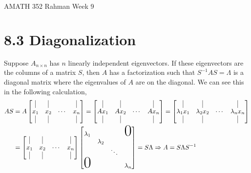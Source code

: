 \documentclass[reqno]{amsart}
\theoremstyle{definition}
\begin{document}
\begin{flushleft}
{\sc \Large AMATH 352 Rahman} \hfill Week 9
\bigskip
\end{flushleft}

\newcommand{\R}{\mathbb{R}}
\newcommand{\N}{\mathbb{N}}
\newcommand{\Z}{\mathbb{Z}}
\newcommand{\Q}{\mathbb{Q}}
\renewcommand{\CancelColor}{\color{red}}
\newcommand{\?}{\stackrel{?}{=}}
\renewcommand{\varphi}{\phi}
\newcommand{\card}{\text{Card}}
\newcommand{\bigzero}{\text{\Huge 0}}
\newcommand{\curvearrowdown}{{\color{red}\rotatebox{90}{$\curvearrowleft$}}}
\newcommand{\curvearrowup}{{\color{red}\rotatebox{90}{$\curvearrowright$}}}

\newcommand*\circled[1]{\color{red}\tikz[baseline=(char.base)]{
            \node[shape=circle,draw,inner sep=2pt] (char) {#1};}}



\section*{8.3 Diagonalization}

Suppose $A_{n\times n}$ has $n$ linearly independent eigenvectors.  If these eigenvectors are the columns of a matrix $S$, then $A$ has a factorization such that $S^{-1}AS = \Lambda$ is a diagonal matrix where the eigenvalues of $A$ are on the diagonal.  We can see this in the following calculation,
%
\begin{align*}
AS &= A\begin{bmatrix}
\vline & \vline & & \vline\\
x_1 & x_2 & \cdots & x_n\\
\vline & \vline & & \vline
\end{bmatrix} = \begin{bmatrix}
\vline & \vline & & \vline\\
Ax_1 & Ax_2 & \cdots & Ax_n\\
\vline & \vline & & \vline
\end{bmatrix} = \begin{bmatrix}
\vline & \vline & & \vline\\
\lambda_1x_1 & \lambda_2x_2 & \cdots & \lambda_nx_n\\
\vline & \vline & & \vline
\end{bmatrix}\\
&= \begin{bmatrix}
\vline & \vline & & \vline\\
x_1 & x_2 & \cdots & x_n\\
\vline & \vline & & \vline
\end{bmatrix}\begin{bmatrix}
\lambda_1 & &  & \bigzero\\
 & \lambda_2 &  & \\
 & & \ddots & \\
\bigzero & & & \lambda_n
\end{bmatrix} = S\Lambda \Rightarrow A = S\Lambda S^{-1}
\end{align*}
\end{document}
